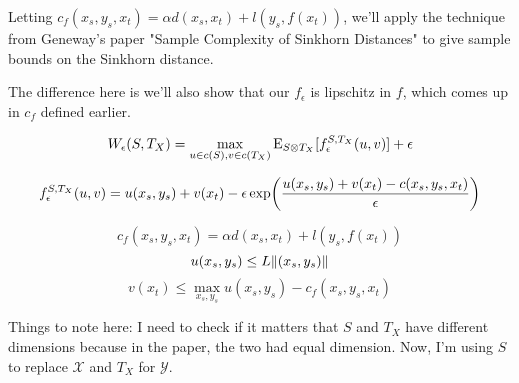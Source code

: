 %
%
%

Letting $c_f(x_s,y_s,x_t) = \alpha d(x_s,x_t) + l(y_s,f(x_t))$, we'll apply the technique from Geneway's paper "Sample Complexity of Sinkhorn Distances" to give sample bounds on the Sinkhorn distance.

The difference here is we'll also show that our $f_{\epsilon}$ is lipschitz in $f$, which comes up in $c_f$ defined earlier.

$$W_{\epsilon}(S,T_X) = \max_{u\in c(S),v\in c(T_X)} \mathrm{E}_{S\otimes T_X} [f_{\epsilon}^{S,T_X}(u,v)]+\epsilon$$

$$f_{\epsilon}^{S,T_X}(u,v) = u(x_s,y_s)+v(x_t)-\epsilon \exp \paren*{\frac{u(x_s,y_s)+v(x_t)-c(x_s,y_s,x_t)}{\epsilon}}$$

$$c_f(x_s,y_s,x_t) = \alpha d(x_s,x_t)+l(y_s,f(x_t))$$
$$u(x_s,y_s)\leq L\lVert(x_s,y_s)\rVert$$
$$v(x_t) \leq \max_{x_s,y_s} u(x_s,y_s)-c_f(x_s,y_s,x_t)$$

Things to note here:
I need to check if it matters that $S$ and $T_X$ have different dimensions because in the paper, the two had equal dimension. Now, I'm using $S$ to replace $\mathcal{X}$ and $T_X$ for $\mathcal{Y}$.

